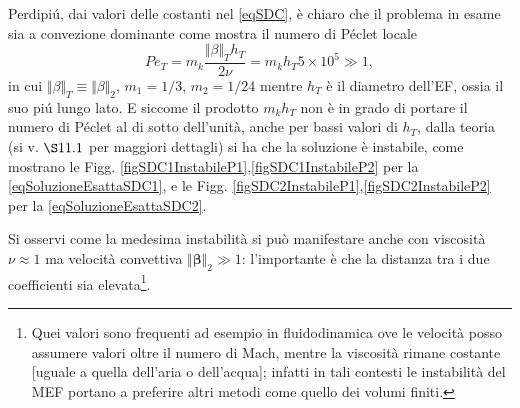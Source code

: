 \documentclass{article}
\newcommand{\SpaziaturaMate}[3]{
    \setlength{\thinmuskip}{#1mu}
    \setlength{\medmuskip}{#2mu}
    \setlength{\thickmuskip}{#3mu}
}
\begin{document}
                Perdipiú, dai valori delle costanti nel \eqref{eqSDC}, è chiaro che il problema in esame sia a convezione dominante come mostra il numero di Péclet locale
                \begin{equation}
                    Pe_T=m_k\frac{\Vert\beta\Vert_Th_T}{2\nu}=m_kh_T5\times10^5\gg1,
                    \label{eqNumeroPeclet}
                \end{equation}
                in cui $\Vert\beta\Vert_T\equiv\Vert\beta\Vert_2$, $m_1=1/3$, $m_2=1/24$ mentre $h_T$ è il diametro dell'EF, ossia il suo piú lungo lato. E siccome il prodotto $m_kh_T$ non è in grado di portare il numero di Péclet al di sotto dell'unità, anche per bassi valori di $h_T$, dalla teoria (si v. \cite{dispenseMEDèPA} $\S11.1$ per maggiori dettagli) si ha che la soluzione è instabile, come mostrano le Figg. \ref{figSDC1InstabileP1},\ref{figSDC1InstabileP2} per la \eqref{eqSoluzioneEsattaSDC1}, e le Figg. \ref{figSDC2InstabileP1},\ref{figSDC2InstabileP2} per la \eqref{eqSoluzioneEsattaSDC2}.

                {\SpaziaturaMate{1}{2}{3}
                Si osservi come la medesima instabilità si può manifestare anche con viscosità $\nu\approx1$ ma velocità convettiva $\Vert\boldsymbol\beta\Vert_2\gg1$: l'importante è che la distanza tra i due coefficienti sia elevata\footnote{Quei valori sono frequenti ad esempio in fluidodinamica ove le velocità posso assumere valori oltre il numero di Mach, mentre la viscosità rimane costante [uguale a quella dell'aria o dell'acqua]; infatti in tali contesti le instabilità del MEF portano a preferire altri metodi come quello dei volumi finiti.}.}
                
\end{document}
